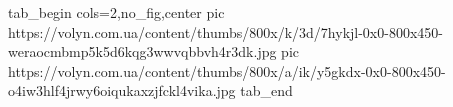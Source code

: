  
 
 
 
 


\ifcmt
  tab_begin cols=2,no_fig,center
     pic https://volyn.com.ua/content/thumbs/800x/k/3d/7hykjl-0x0-800x450-weraocmbmp5k5d6kqg3wwvqbbvh4r3dk.jpg
		 pic https://volyn.com.ua/content/thumbs/800x/a/ik/y5gkdx-0x0-800x450-o4iw3hlf4jrwy6oiqukaxzjfckl4vika.jpg
  tab_end
\fi
